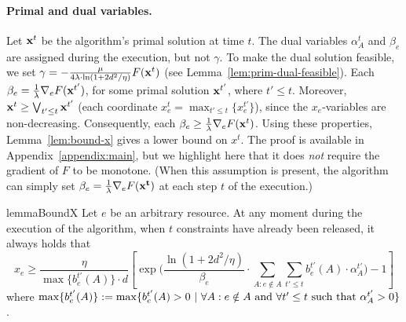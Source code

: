 \paragraph{Primal and dual variables.}
Let $\mathbf{x}^{t}$ be the algorithm's primal solution at time $t$. The dual variables $\alpha^{t}_{A}$ and $\beta_{e}$ are assigned during the execution, but not $\gamma$. To make the dual solution feasible, we set $\gamma = -\frac{\mu}{4\lambda \cdot \ln(1+2d^{2}/\eta)} F(\mathbf{x}^t)$ (see Lemma~\ref{lem:prim-dual-feasible}). Each $\beta_{e} = \frac{1}{\lambda} \nabla_{e} F(\mathbf{x}^{t'})$, for some primal solution $\mathbf{x}^{t'}$, where $t' \le t$. Moreover, $\mathbf{x}^t \geq \bigvee_{t' \le t} \mathbf{x}^{t'}$ (each coordinate $x^{t}_{e} = \max_{t' \le t}\{x^{t'}_{e}\}$), since the $x_e$-variables are non-decreasing. Consequently, each $\beta_{e} \geq \frac{1}{\lambda} \nabla_{e} F(\mathbf{x}^t)$. Using these properties, Lemma~\ref{lem:bound-x} gives a lower bound on $x^{t}$.
The proof is available in Appendix~\ref{appendix:main}, but we highlight here that it does \emph{not} require the gradient of $F$ to be monotone.
(When this assumption is present, the algorithm can simply set $\beta_{e} = \frac{1}{\lambda} \nabla_{e} F(\mathbf{x^{t}})$ at each step $t$ of the execution.)


\begin{restatable}{lemma}{BoundX}
\label{lem:bound-x}
Let $e$ be an arbitrary resource.
At any moment during the execution of the algorithm,
when $t$ constraints have already been released, it always holds that
$$
x_{e}	\geq  \frac{\eta}{\max \{b^{t'}_{e}(A)\} \cdot d}
		\left[ \exp\biggl( \frac{\ln(1+2d^{2}/\eta)}{\beta_{e}}
				\cdot \sum_{A: e \notin A} \sum_{t' \le t} b^{t'}_{e}(A) \cdot \alpha^{t'}_{A} \biggr) - 1 \right]
$$
where $\max \{b^{t'}_{e}(A)\} := \max \{b^{t'}_{e}(A) > 0\ |\ \forall A: e \notin A \textnormal{ and }\forall t' \leq t \textnormal{ such that } \alpha^{t'}_{A} > 0\}$.
\end{restatable}


